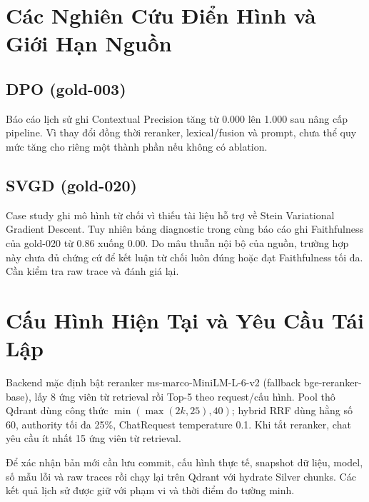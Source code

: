 \section{Các Nghiên Cứu Điển Hình và Giới Hạn Nguồn}
\subsection{DPO (gold-003)}
Báo cáo lịch sử ghi Contextual Precision tăng từ 0.000 lên 1.000 sau nâng cấp pipeline. Vì thay đổi đồng thời reranker, lexical/fusion và prompt, chưa thể quy mức tăng cho riêng một thành phần nếu không có ablation.

\subsection{SVGD (gold-020)}
Case study ghi mô hình từ chối vì thiếu tài liệu hỗ trợ về Stein Variational Gradient Descent. Tuy nhiên bảng diagnostic trong cùng báo cáo ghi Faithfulness của gold-020 từ 0.86 xuống 0.00. Do mâu thuẫn nội bộ của nguồn, trường hợp này chưa đủ chứng cứ để kết luận từ chối luôn đúng hoặc đạt Faithfulness tối đa. Cần kiểm tra raw trace và đánh giá lại.

\section{Cấu Hình Hiện Tại và Yêu Cầu Tái Lập}
Backend mặc định bật reranker ms-marco-MiniLM-L-6-v2 (fallback bge-reranker-base), lấy 8 ứng viên từ retrieval rồi Top-5 theo request/cấu hình. Pool thô Qdrant dùng công thức $\min(\max(2k,25),40)$; hybrid RRF dùng hằng số 60, authority tối đa 25\%, ChatRequest temperature 0.1. Khi tắt reranker, chat yêu cầu ít nhất 15 ứng viên từ retrieval.

Để xác nhận bản mới cần lưu commit, cấu hình thực tế, snapshot dữ liệu, model, số mẫu lỗi và raw traces rồi chạy lại trên Qdrant với hydrate Silver chunks. Các kết quả lịch sử được giữ với phạm vi và thời điểm đo tường minh.
